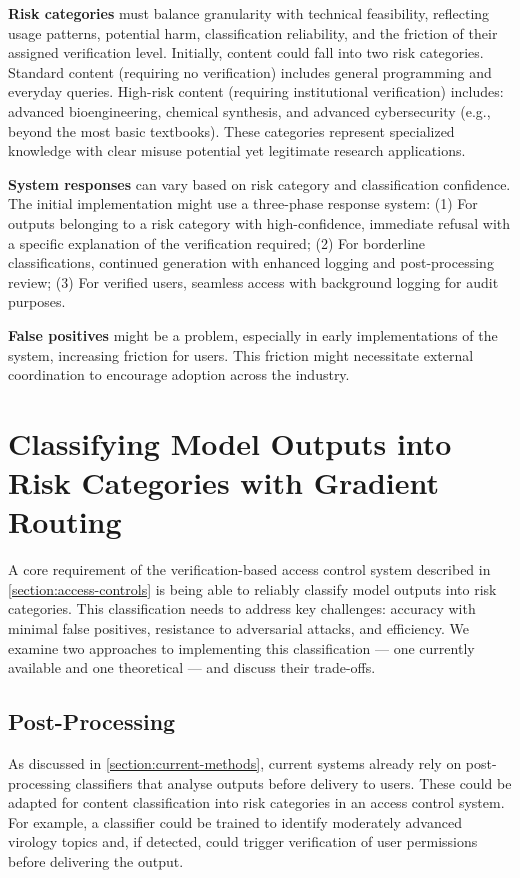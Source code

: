 \documentclass{article}
\theoremstyle{plain}
\theoremstyle{definition}
\theoremstyle{remark}
\begin{document}
\textbf{Risk categories} must balance granularity with technical
feasibility, reflecting usage patterns, potential harm,
classification reliability, and the friction of their assigned
verification level. Initially, content could fall into two risk
categories. Standard content (requiring no verification) includes
general programming and everyday queries. High-risk content
(requiring institutional verification) includes: advanced
bioengineering, chemical synthesis, and advanced cybersecurity (e.g.,
beyond the most basic textbooks). These categories represent
specialized knowledge with clear misuse potential yet legitimate
research applications.

\textbf{System responses} can vary based on risk category and
classification confidence.
The initial implementation might use a three-phase response system:
(1) For outputs belonging to a risk category with high-confidence,
immediate refusal with a specific explanation of the verification
required; (2) For borderline classifications, continued generation
with enhanced logging and post-processing review; (3) For verified
users, seamless access with background logging for audit purposes.

\textbf{False positives} might be a problem, especially in early
implementations of the system, increasing friction for users. This
friction might necessitate external coordination to encourage
adoption across the industry.

\section{Classifying Model Outputs into Risk Categories with Gradient
Routing} \label{section:risk-classification}

A core requirement of the verification-based access control system
described in \cref{section:access-controls} is being able to reliably
classify model outputs into risk categories.
This classification needs to address key challenges: accuracy with
minimal false positives, resistance to adversarial attacks, and efficiency.
We examine two approaches to implementing this classification --- one
currently available and one theoretical --- and discuss their trade-offs.

\subsection{Post-Processing}

As discussed in \cref{section:current-methods}, current systems
already rely on post-processing classifiers that analyse outputs
before delivery to users.
These could be adapted for content classification into risk
categories in an access control system.
For example, a classifier could be trained to identify moderately
advanced virology topics and, if detected, could trigger verification
of user permissions before delivering the output.
\end{document}
